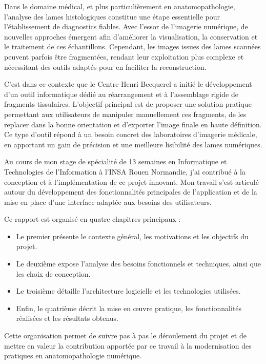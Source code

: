 \documentclass[12pt,a4paper]{report}
\begin{document}
Dans le domaine médical, et plus particulièrement en anatomopathologie, l'analyse des lames histologiques constitue une étape essentielle pour l'établissement de diagnostics fiables. Avec l'essor de l'imagerie numérique, de nouvelles approches émergent afin d'améliorer la visualisation, la conservation et le traitement de ces échantillons. Cependant, les images issues des lames scannées peuvent parfois être fragmentées, rendant leur exploitation plus complexe et nécessitant des outils adaptés pour en faciliter la reconstruction.

C'est dans ce contexte que le Centre Henri Becquerel a initié le développement d'un outil informatique dédié au réarrangement et à l'assemblage rigide de fragments tissulaires. L'objectif principal est de proposer une solution pratique permettant aux utilisateurs de manipuler manuellement ces fragments, de les replacer dans la bonne orientation et d'exporter l'image finale en haute définition. Ce type d'outil répond à un besoin concret des laboratoires d'imagerie médicale, en apportant un gain de précision et une meilleure lisibilité des lames numériques.

Au cours de mon stage de spécialité de 13 semaines en Informatique et Technologies de l'Information à l'INSA Rouen Normandie, j'ai contribué à la conception et à l'implémentation de ce projet innovant. Mon travail s'est articulé autour du développement des fonctionnalités principales de l'application et de la mise en place d'une interface adaptée aux besoins des utilisateurs.

Ce rapport est organisé en quatre chapitres principaux :
\begin{itemize}
\item Le premier présente le contexte général, les motivations et les objectifs du projet.
\item Le deuxième expose l'analyse des besoins fonctionnels et techniques, ainsi que les choix de conception.
\item Le troisième détaille l'architecture logicielle et les technologies utilisées.
\item Enfin, le quatrième décrit la mise en œuvre pratique, les fonctionnalités réalisées et les résultats obtenus.
\end{itemize}

Cette organisation permet de suivre pas à pas le déroulement du projet et de mettre en valeur la contribution apportée par ce travail à la modernisation des pratiques en anatomopathologie numérique.
\end{document}
